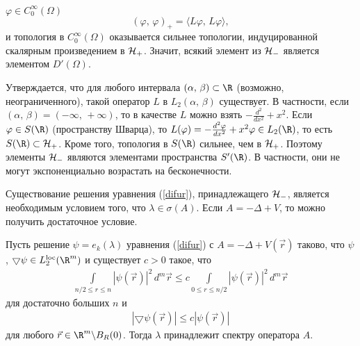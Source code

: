 \documentclass[a4paper
]{article}
\begin{document}
$\varphi\in C_0^\infty(\Omega)$ $$(\varphi , \, \varphi)_+
=\langle L\varphi, \, L\varphi\rangle ,$$
и топология в $C_0^\infty(\Omega)$ оказывается
сильнее топологии, индуцированной скалярным произведением в ${\cal H}_+$.
Значит, всякий элемент из ${\cal H}_-$ является элементом $D'(\Omega)$.
\par
Утверждается, что для любого интервала $(\alpha, \, \beta)\subset \R$
(возможно, неограниченного), такой оператор $L$ в $L_2(\alpha, \, \beta)$
существует. В частности, если $(\alpha, \, \beta)=(-\infty, \, +\infty)$,
то в качестве $L$ можно взять $-\frac{d^2}{dx^2}+x^2$. Если $\varphi\in
S(\R)$ (пространству Шварца), то $L(\varphi)=-\frac{d^2\varphi}{dx^2}
+x^2\varphi\in L_2(\R)$, то есть $S(\R)\subset {\cal H}_+$. Кроме того,
топология в $S(\R)$ сильнее, чем в ${\cal H}_+$. Поэтому элементы
${\cal H}_-$ являются элементами пространства $S'(\R)$. В частности,
они не могут экспоненциально возрастать на бесконечности. \par
Существование решения уравнения (\ref{difur}), принадлежащего ${\cal H}_-$,
является необходимым условием того, что $\lambda\in \sigma(A)$. Если
$A=-\Delta+V$, то можно получить достаточное условие.
\begin{Sta}
\label{bound}
Пусть решение $\psi=e_k(\lambda)$ уравнения (\ref{difur}) с
$A=-\Delta+V(\vec{r})$ таково, что $\psi$, $\bigtriangledown \psi\in
L_2^{{\rm loc}}(\R^m)$ и существует $c>0$ такое, что
\begin{align}
\label{bound_cond1}
\int \limits _{n/2\le r\le n}|\psi(\vec{r})|^2\, d^m\vec{r}\le c\int \limits_{0\le r\le
n/2}|\psi(\vec{r})|^2\,d^m\vec{r}
\end{align}
для достаточно больших $n$ и
\begin{align}
\label{bound_cond2}
|\bigtriangledown \psi(\vec{r})|\le c|\psi(\vec{r})|
\end{align}
для любого $\vec{r}\in \R^m\backslash B_R(0)$. Тогда $\lambda$
принадлежит спектру оператора $A$.
\end{Sta}
\end{document}
